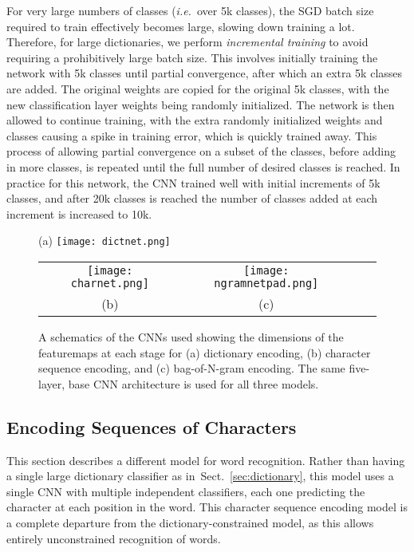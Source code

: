 \documentclass{article} \usepackage{nips14submit_e,times}
\newcommand{\sref}[1]{Sect.~\ref{#1}}
\def\ie{\emph{i.e.}}
\begin{document}
For very large numbers of classes (\ie~over 5k classes), the SGD batch size required to train effectively becomes large, slowing down training a lot. Therefore, for large dictionaries, we perform \emph{incremental training} to avoid requiring a prohibitively large batch size. This involves initially training the network with 5k classes until partial convergence, after which an extra 5k classes are added. The original weights are copied for the original 5k classes, with the new classification layer weights being randomly initialized. The network is then allowed to continue training, with the extra randomly initialized weights and classes causing a spike in training error, which is quickly trained away. This process of allowing partial convergence on a subset of the classes, before adding in more classes, is repeated until the full number of desired classes is reached. In practice for this network, the CNN trained well with initial increments of 5k classes, and after 20k classes is reached the number of classes added at each increment is increased to 10k.

\begin{figure}[t]
\centering
\vspace{-1em}
(a)
\texttt{[image: dictnet.png]}
\begin{tabular}{cccc}
\texttt{[image: charnet.png]}&
\texttt{[image: ngramnetpad.png]}
\vspace{-2em}
\\
(b)&(c)
\end{tabular}
\vspace{-1em}
\caption{A schematics of the CNNs used showing the dimensions of the featuremaps at each stage for (a) dictionary encoding, (b) character sequence encoding, and (c) bag-of-N-gram encoding. The same five-layer, base CNN architecture is used for all three models.}
\label{fig:dictnet}
\end{figure}

\subsection{Encoding Sequences of Characters}\label{sec:characters}
This section describes a different model for word recognition. Rather than having a single large dictionary classifier as in~\sref{sec:dictionary}, this model uses a single CNN with multiple independent classifiers, each one predicting the character at each position in the word. 
This character sequence encoding model is a complete departure from the dictionary-constrained model, as this allows entirely unconstrained recognition of words.
\end{document}
